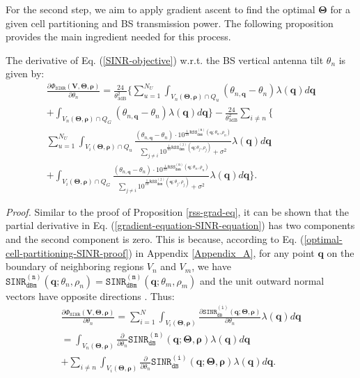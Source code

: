 For the second step, we aim to apply gradient ascent to find the optimal $\bm{\Theta}$ for a given cell partitioning and BS transmission power. The following proposition provides the main ingredient needed for this process.
\begin{Proposition}\label{gradient-equation-SINR}
The derivative of Eq. (\ref{SINR-objective}) w.r.t. the BS vertical antenna tilt $\theta_n$ is given by:
\begin{multline}\label{gradient-equation-SINR-equation}
     \frac{\partial \Phi_{\mathtt{SINR}}(\bm{V}, \bm{\Theta}, \bm{\rho})}{\partial \theta_n} =  \frac{24}{\theta^2_{\mathrm{3dB}}} \Bigg\{ \sum_{u=1}^{N_U} \int_{V_n(\mathbf{\Theta}, \bm{\rho})\cap Q_u} \!\!\!\!\!\!\!\!\!\!\!\! (\theta_{n,\bm{q}}-\theta_n) \lambda(\bm{q}) d\bm{q}  
    \\ +  \int_{V_n(\mathbf{\Theta}, \bm{\rho})\cap Q_G} \!\!\!\! (\theta_{n,\bm{q}}-\theta_n) \lambda(\bm{q}) d\bm{q} \Bigg\}  -\frac{24}{\theta^2_{\mathrm{3dB}}} \sum_{i\neq n}^{}  \Bigg\{ \\ \sum_{u=1}^{N_U} \int_{V_i(\mathbf{\Theta}, \bm{\rho})\cap Q_u}  \frac{(\theta_{n,\bm{q}}-\theta_n) \cdot 10^{\frac{1}{10}\mathtt{RSS_{dBm}^{(n)}} (\bm{q}; \theta_n, \rho_n)}}{{\sum_{j\neq i}^{} 10^{\frac{1}{10}\mathtt{RSS_{dBm}^{(j)}} (\bm{q}; \theta_j, \rho_j)} + \sigma^2}} \lambda(\bm{q}) d\bm{q} 
    \\+ \int_{V_i(\mathbf{\Theta}, \bm{\rho})\cap Q_G}  \frac{(\theta_{n,\bm{q}}-\theta_n) \cdot 10^{\frac{1}{10}\mathtt{RSS_{dBm}^{(n)}} (\bm{q}; \theta_n, \rho_n)}}{{\sum_{j\neq i}^{} 10^{\frac{1}{10}\mathtt{RSS_{dBm}^{(j)}} (\bm{q}; \theta_j,\rho_j)} + \sigma^2}} \lambda(\bm{q}) d\bm{q} \Bigg\}.
\end{multline}
\end{Proposition}
\textit{Proof. }Similar to the proof of Proposition \ref{rss-grad-eq}, it can be shown that the partial derivative in Eq. (\ref{gradient-equation-SINR-equation}) has two components and the second component is zero. This is because, according to Eq. (\ref{optimal-cell-partitioning-SINR-proof}) in Appendix \ref{Appendix_A}, for any point $\bm{q}$ on the boundary of neighboring regions $V_n$ and $V_m$, we have $\mathtt{SINR_{dBm}^{(n)}}(\bm{q}; \theta_n, \rho_n) = \mathtt{SINR_{dBm}^{(m)}}(\bm{q}; \theta_m, \rho_m)$ and the unit outward normal vectors have opposite directions \cite{GuoJaf2016}. Thus:
\begin{multline}\label{eqn:derivativePhi-SINR}
    \frac{\partial \Phi_{\mathtt{SINR}}(\bm{V},\mathbf{\Theta}, \bm{\rho})}{\partial \theta_n} = 
    \sum_{i=1}^{N} \int_{V_i(\mathbf{\Theta}, \bm{\rho})} \!\!\!\frac{\partial \mathtt{SINR_{dB}^{(i)}} (\bm{q}; \mathbf{\Theta}, \bm{\rho})}{\partial \theta_n}  \lambda(\bm{q})d\bm{q} \\
     =
    \int_{V_n(\mathbf{\Theta}, \bm{\rho})} \frac{\partial}{\partial \theta_n} \mathtt{SINR_{dB}^{(n)}} (\bm{q}; \mathbf{\Theta}, \bm{\rho}) \lambda(\bm{q})d\bm{q} 
      \\ + \sum_{i\neq n}^{} \int_{V_i(\mathbf{\Theta}, \bm{\rho})} \frac{\partial}{\partial \theta_n} \mathtt{SINR_{dB}^{(i)}} (\bm{q}; \mathbf{\Theta}, \bm{\rho}) \lambda(\bm{q})d\bm{q}.
\end{multline}
